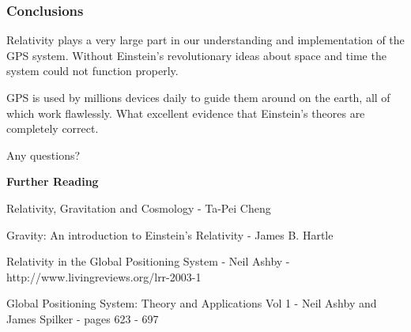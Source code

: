 \documentclass[xcolor=dvipsnames,usepdftitle=false]{beamer}
\begin{document}
\begin{frame}

\frametitle{Conclusions}

Relativity plays a very large part in our understanding and implementation of the GPS system. Without Einstein's revolutionary ideas about space and time the system could not function properly.

\vspace{\baselineskip}

GPS is used by millions devices daily to guide them around on the earth, all of which work flawlessly. What excellent evidence that Einstein's theores are completely correct.

\end{frame}

\begin{frame}[plain]

\begin{center}
Any questions?
\end{center}

\vspace{\baselineskip}

\textbf{Further Reading} 

Relativity, Gravitation and Cosmology - Ta-Pei Cheng 

\vspace{\baselineskip}

Gravity: An introduction to Einstein's Relativity - James B. Hartle 

\vspace{\baselineskip}

Relativity in the Global Positioning System - Neil Ashby - http://www.livingreviews.org/lrr-2003-1 

\vspace{\baselineskip}

Global Positioning System: Theory and Applications Vol 1 - Neil Ashby and James Spilker - pages 623 - 697 
\end{frame}
\end{document}
